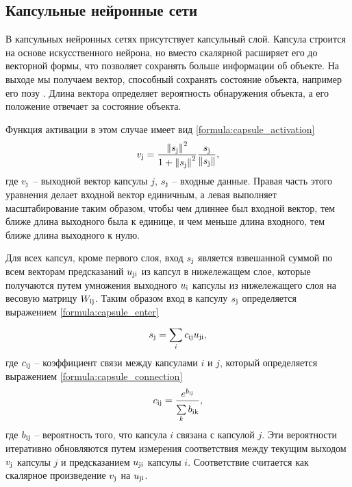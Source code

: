 \subsection{Капсульные нейронные сети}

В капсульных нейронных сетях присутствует капсульный слой. Капсула строится на основе искусственного нейрона, но вместо скалярной расширяет его до векторной формы, что позволяет сохранять больше информации об объекте. На выходе мы получаем вектор, способный сохранять состояние объекта, например его позу \cite{capsule2}. Длина вектора определяет вероятность обнаружения объекта, а его положение отвечает за состояние объекта.

Функция активации в этом случае имеет вид \ref{formula:capsule_activation}
\begin{equation}\label{formula:capsule_activation}
v_{\rm{j}} = \frac{\left\| s_{\rm{j}} \right\|^2}{1 + \left\| s_{\rm{j}} \right\|^2} \frac{s_{\rm{j}}}{\left\| s_{\rm{j}} \right\|},
\end{equation}
где $v_{\rm{j}}$ -- выходной вектор капсулы $j$, $s_{\rm{j}}$ -- входные данные. Правая часть этого уравнения делает входной вектор единичным, а левая выполняет масштабирование таким образом, чтобы чем длиннее был входной вектор, тем ближе длина выходного была к единице, и чем меньше длина входного, тем ближе длина выходного к нулю.

Для всех капсул, кроме первого слоя, вход $s_{\rm{j}}$ является взвешанной суммой по всем векторам предсказаний $u_{\rm{ji}}$ из капсул в нижележащем слое, которые получаются путем умножения выходного $u_{\rm{i}}$ капсулы из нижележащего слоя на весовую матрицу $W_{\rm{ij}}$. Таким образом вход в капсулу $s_{\rm{j}}$ определяется выражением \ref{formula:capsule_enter}
\begin{equation}\label{formula:capsule_enter}
s_{\rm{j}} = \sum\limits_{i}^{}c_{\rm{ij}}u_{\rm{ji}},
\end{equation}
где $c_{\rm{ij}}$ -- коэффициент связи между капсулами $i$ и $j$, который определяется выражением \ref{formula:capsule_connection}
\begin{equation}\label{formula:capsule_connection}
c_{\rm{ij}} = \frac{e^{b_{\rm{ij}}}}{\sum\limits_{k}^{}b_{\rm{ik}}},
\end{equation}
где $b_{\rm{ij}}$ -- вероятность того, что капсула $i$ связана с капсулой $j$. Эти вероятности итеративно обновляются путем измерения соответствия между текущим выходом $v_{\rm{j}}$ капсулы $j$ и предсказанием $u_{\rm{ji}}$ капсулы $i$. Соответствие считается как скалярное произведение $v_{\rm{j}}$ на $u_{\rm{ji}}$.

